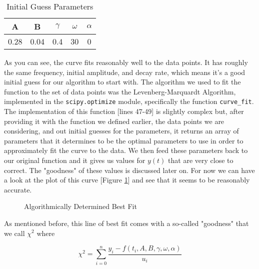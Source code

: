\documentclass[12pt]{article}
\begin{document}
    \begin{table}[H]
        \centering
        \begin{tabular}{c c c c c}
            \hline
            A & B & $\gamma$ & $\omega$ & $\alpha$ \\
            \hline
            0.28 & 0.04 & 0.4 & 30 & 0 \\
            \hline
        \end{tabular}
        \caption{Initial Guess Parameters}
        \label{table:Initial Params}
    \end{table}
    
    \noindent
    As you can see, the curve fits reasonably well to the data points. It has roughly the same 
    frequency, initial amplitude, and decay rate, which means it's a good initial guess for our 
    algorithm to start with. 
    \newline
    \newline
    The algorithm we used to fit the function to the set of data points was the Levenberg-Marquardt 
    Algorithm, implemented in the \texttt{scipy.optimize} module, specifically the function 
    \texttt{curve\_fit}. The implementation of this function [lines 47-49] is slightly complex 
    but, after providing it with the function we defined earlier, the data points we are 
    considering, and out initial guesses for the parameters, it returns an array of parameters 
    that it determines to be the optimal parameters to use in order to approximately fit the 
    curve to the data. We then feed these parameters back to our original function and it gives 
    us values for $y(t)$ that are very close to correct. The "goodness" of these values is 
    discussed later on. For now we can have a look at the plot of this curve [Figure \ref{fig:Best Fit}] 
    and see that it seems to be reasonably accurate. 

    \begin{figure}[H]
        \begin{center}
           \scalebox{.8}{}
           \caption{Algorithmically Determined Best Fit}
           \label{fig:Best Fit}
        \end{center}
    \end{figure}
    
    \newpage\noindent
    As mentioned before, this line of best fit comes with a so-called "goodness" that we call 
    $\chi ^2$ where

    \begin{equation}
        \chi^2=\sum\limits_{i=0}^{n}\frac{y_i-f(t_i,A,B,\gamma,\omega,\alpha)}{u_i}
    \end{equation}
\end{document}
